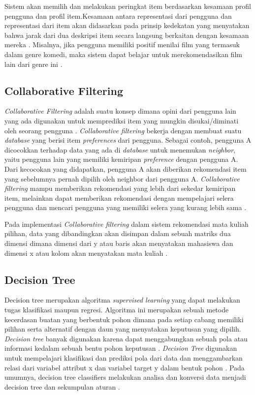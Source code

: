 Sistem akan memilih dan melakukan peringkat item berdasarkan kesamaan profil pengguna dan profil item.Kesamaan antara representasi dari pengguna dan representasi dari
item akan didasarkan pada prinsip kedekatan yang menyatakan bahwa jarak dari dua deskripsi item secara langsung berkaitan dengan kesamaan mereka \citep{rekomendasiTanaman}.
Misalnya, jika pengguna memiliki positif menilai film yang termasuk dalam genre komedi, maka sistem dapat belajar untuk
merekomendasikan film lain dari genre ini \citep{handbook}.


\subsection{Collaborative Filtering}
\emph{Collaborative Filtering} adalah suatu konsep dimana opini dari pengguna lain yang ada digunakan untuk memprediksi item yang mungkin disukai/diminati oleh seorang pengguna \citep{handbook}.
\emph{Collaborative filtering} bekerja dengan membuat suatu \emph{database} yang berisi item \emph{preferences} dari pengguna. Sebagai contoh, pengguna A dicocokkan terhadap data yang ada di \emph{database} untuk menemukan
\emph{neighbor}, yaitu pengguna lain yang memiliki kemiripan \emph{preference} dengan pengguna A. Dari kecocokan yang didapatkan, pengguna A akan diberikan rekomendasi item yang sebelumnya pernah dipilih oleh neighbor dari
pengguna A. \emph{Collaborative filtering} mampu memberikan rekomendasi yang lebih dari sekedar kemiripan item, melainkan dapat memberikan rekomendasi dengan mempelajari selera pengguna dan mencari pengguna yang memiliki selera yang kurang lebih sama \citep{contentBasedXCollaborative}.

Pada implementasi \emph{Collaborative filtering} dalam sistem rekomendasi mata kuliah pilihan, data yang dibandingkan akan disimpan dalam sebuah matriks dua dimensi dimana dimensi dari y atau baris akan menyatakan mahasiswa dan dimensi x atau kolom akan menyatakan mata kuliah
\citep{cosineSimilarity}.


\subsection{Decision Tree}
Decision tree merupakan algoritma \emph{supervised learning} yang dapat melakukan tugas klasifikasi maupun regresi. Algoritma ini merupakan sebuah metode kecerdasan buatan yang berbentuk pohon dimana pada setiap cabang memiliki
pilihan serta alternatif dengan daun yang menyatakan keputusan yang dipilih. \emph{Decision tree} banyak digunakan karena dapat menggabungkan sebuah pola atau informasi kedalam sebuah bentu pohon keputusan \citep{decisionTreeObat}.
\emph{Decision Tree} digunakan untuk mempelajari klasifikasi dan prediksi pola dari data dan menggambarkan relasi dari variabel attribut x dan variabel target y dalam bentuk pohon \citep{dataMiningBook}. Pada umumnya, decision tree classifiers
melakukan analisa dan konversi data menjadi decision tree dan sekumpulan aturan \citep{contentBasedXCollaborative}.

